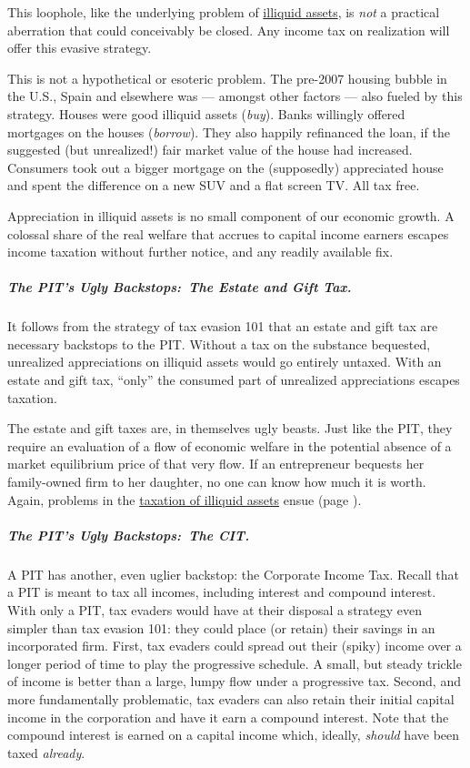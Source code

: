 This loophole, like the underlying problem of \hyperref[sec:TaxIlliquid]{illiquid assets}, is \emph{not} a practical aberration that could conceivably be closed.
Any income tax on realization will offer this evasive strategy.

This is not a hypothetical or esoteric problem.
The pre-2007 housing bubble in the U.S., Spain and elsewhere was --- amongst other factors --- also fueled by this strategy.
Houses were good illiquid assets (\emph{buy}).
Banks willingly offered mortgages on the houses (\emph{borrow}).
They also happily refinanced the loan, if the suggested (but unrealized!) fair market value of the house had increased.
Consumers took out a bigger mortgage on the (supposedly) appreciated house and spent the difference on a new SUV and a flat screen TV.
All tax free.

Appreciation in illiquid assets is no small component of our economic growth.
A colossal share of the real welfare that accrues to capital income earners escapes income taxation without further notice, and any readily available fix.

\subparagraph{The PIT's Ugly Backstops:~The Estate and Gift Tax.} It follows from the strategy of tax evasion 101 that an estate and gift tax are necessary backstops to the PIT.
Without a tax on the substance bequested, unrealized appreciations on illiquid assets would go entirely untaxed.
With an estate and gift tax, ``only'' the consumed part of unrealized appreciations escapes taxation.

The estate and gift taxes are, in themselves ugly beasts.
Just like the PIT, they require an evaluation of a flow of economic welfare in the potential absence of a market equilibrium price of that very flow.
If an entrepreneur bequests her family-owned firm to her daughter, no one can know how much it is worth.
Again, problems in the \hyperref[sec:Illiquid]{taxation of illiquid assets} ensue (page \pageref{sec:Illiquid}).

\subparagraph{The PIT's Ugly Backstops:~The CIT.}  \label{sec:ScoreCIT} A PIT has another, even uglier backstop:
the Corporate Income Tax.
Recall that a PIT is meant to tax all incomes, including interest and compound interest.
With only a PIT, tax evaders would have at their disposal a strategy even simpler than tax evasion 101:
they could place (or retain) their savings in an incorporated firm.
First, tax evaders could spread out their (spiky) income over a longer period of time to play the progressive schedule.
A small, but steady trickle of income is better than a large, lumpy flow under a progressive tax.
Second, and more fundamentally problematic, tax evaders can also retain their initial capital income in the corporation and have it earn a compound interest.
Note that the compound interest is earned on a capital income which, ideally, \emph{should} have been taxed \emph{already}.

